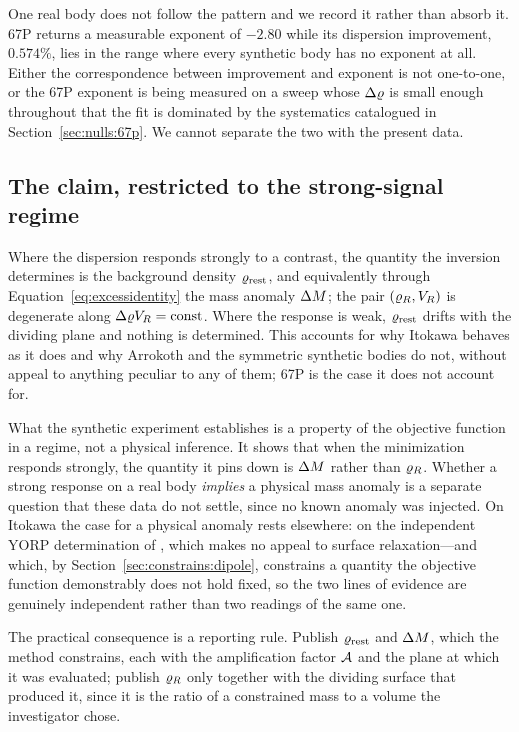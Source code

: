 One real body does not follow the pattern and we record it rather than
absorb it. 67P returns a measurable exponent of $-2.80$ while its
dispersion improvement, $0.574\%$, lies in the range where every synthetic
body has no exponent at all. Either the correspondence between improvement
and exponent is not one-to-one, or the 67P exponent is being measured on a
sweep whose $\Delta\varrho$ is small enough throughout that the fit is dominated by
the systematics catalogued in Section~\ref{sec:nulls:67p}. We cannot
separate the two with the present data.

\subsection{The claim, restricted to the strong-signal regime}
\label{sec:constrains:claim}

Where the dispersion responds strongly to a contrast, the quantity the
inversion determines is the background density $\varrho_{\mathrm{rest}}$, and equivalently
through Equation~\eqref{eq:excessidentity} the mass anomaly $\Delta M$; the
pair $(\varrho_{R}, V_{R})$ is degenerate along $\Delta\varrho V_{R} = \mathrm{const}$.
Where the response is weak, $\varrho_{\mathrm{rest}}$ drifts with the dividing plane and
nothing is determined. This accounts for why Itokawa behaves as it does and
why Arrokoth and the symmetric synthetic bodies do not, without appeal to
anything peculiar to any of them; 67P is the case it does not account for.

What the synthetic experiment establishes is a property of the objective
function in a regime, not a physical inference. It shows that when the
minimization responds strongly, the quantity it pins down is $\Delta M$ rather
than $\varrho_{R}$. Whether a strong response on a real body \emph{implies} a
physical mass anomaly is a separate question that these data do not settle,
since no known anomaly was injected. On Itokawa the case for a physical
anomaly rests elsewhere: on the independent YORP determination of
\citet{lowry2014}, which makes no appeal to surface relaxation---and which,
by Section~\ref{sec:constrains:dipole}, constrains a quantity the objective
function demonstrably does not hold fixed, so the two lines of evidence are
genuinely independent rather than two readings of the same one.

The practical consequence is a reporting rule. Publish $\varrho_{\mathrm{rest}}$ and
$\Delta M$, which the method constrains, each with the amplification factor
$\mathcal{A}$ and the plane at which it was evaluated; publish $\varrho_{R}$ only
together with the dividing surface that produced it, since it is the ratio
of a constrained mass to a volume the investigator chose.

